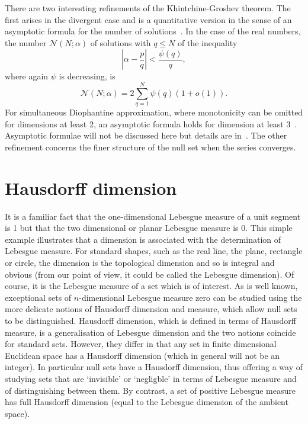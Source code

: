 \documentclass[reqno]{amsart}
\renewcommand{\le}{\leqslant}
\newcommand{\al}{\alpha}
\newcommand{\0}{{\mathbf{0}}}
\newcommand{\DA}{Diophantine approximation}
\newcommand{\HD}{Hausdorff dimension}
\newcommand{\HM}{Hausdorff measure}
\newcommand{\LM}{Lebesgue measure}
\newcommand{\cN}{\mathcal{N}}
\newcommand{\KG}{Khintchine-Groshev}
\begin{document}
There are two interesting refinements of the \KG{} theorem.  The first
arises in the divergent case and is a quantitative version in the
sense of an asymptotic formula for the number of
solutions~\cite{HarmanMNT,Sprindzuk}. In the case of the real numbers,
the number $\cN(N;\alpha)$ of solutions with $q\le N$ of the
inequality
\begin{equation*}
    \left|\al-\frac{p}{q}\right| < \frac{\psi(q)}{q},
\end{equation*}
where again $\psi$ is decreasing, is
\begin{equation*}
  \cN(N;\alpha)=
2\sum_{q=1}^N \psi(q)(1 + o(1)).
\end{equation*}
For simultaneous \DA, where monotonicity can be omitted for dimensions
at least 2, an asymptotic formula holds for dimension at least
3~\cite{Gallagher65}. Asymptotic formulae will
not be discussed here but details are in~\cite{HarmanMNT,Sprindzuk}.
The other refinement concerns the finer structure of the null set when
the series converges.

\section{Hausdorff dimension}


It is a familiar fact that the one-dimensional Lebesgue measure of a
unit segment is 1 but that the two dimensional or planar Lebesgue
measure is 0.  This simple example illustrates that a dimension is
associated with the determination of Lebesgue measure.  For standard
shapes, such as the real line, the plane, rectangle or circle, the
dimension is the topological dimension and so is integral and obvious
(from our point of view, it could be called the Lebesgue dimension).
Of course, it is the Lebesgue measure of a set which is of
interest. As is well known, exceptional sets of $n$-dimensional \LM{}
zero can be studied using the more delicate notions of Hausdorff
dimension and measure, which allow null sets to be distinguished.
Hausdorff dimension, which is defined in terms of \HM, is a
generalisation of Lebesgue dimension and the two notions coincide for
standard sets. However, they differ in that any set in finite
dimensional Euclidean space has a Hausdorff dimension (which in
general will not be an integer).  In particular null sets have a \HD,
thus offering a way of studying sets that are `invisible' or
`negligble' in terms of Lebesgue measure and of distinguishing between
them. By contrast, a set of positive Lebesgue measure has full \HD{}
(equal to the Lebesgue dimension of the ambient space). 
\end{document}
